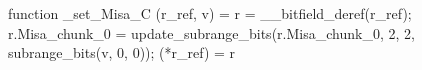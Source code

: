 function _set_Misa_C (r_ref, v) = {
    r = __bitfield_deref(r_ref);
    r.Misa_chunk_0 = update_subrange_bits(r.Misa_chunk_0, 2, 2, subrange_bits(v, 0, 0));
    (*r_ref) = r
}
